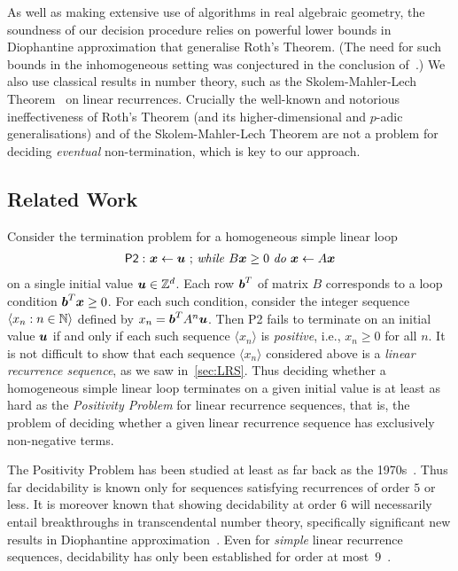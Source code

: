 As well as making extensive use of algorithms in real algebraic
geometry, the soundness of our decision procedure relies on powerful
lower bounds in Diophantine approximation that generalise Roth's
Theorem.  (The need for such bounds in the inhomogeneous setting was
conjectured in the conclusion of~\cite{Bra06}.)  We
also use classical results in number theory, such as the
Skolem-Mahler-Lech Theorem~\cite{Lec53,Mah35,Sko34} on linear
recurrences.  Crucially the well-known and notorious ineffectiveness
of Roth's Theorem (and its higher-dimensional and $p$-adic
generalisations) and of the Skolem-Mahler-Lech Theorem are not a
problem for deciding \emph{eventual} non-termination, which is key to
our approach.

\subsection{Related Work}

Consider the termination problem for a homogeneous simple linear loop
\begin{gather*}
\mathsf{P2:}\  \mbox{$\boldsymbol{x}\gets \boldsymbol{u}$ ;
\textit{while} $B\boldsymbol{x} \geq 0$ \textit{do} $\boldsymbol{x}\leftarrow A\boldsymbol{x}$}
\end{gather*}
on a single initial value $\boldsymbol{u}\in \mathbb{Z}^{d}$.  Each row
$\boldsymbol{b}^T$ of matrix $B$ corresponds to a loop condition
$\boldsymbol{b}^T\boldsymbol{x} \geq 0$.  For each such condition,
consider the integer sequence $\langle x_n : n \in \mathbb{N} \rangle$
defined by $x_n = \boldsymbol{b}^TA^n \boldsymbol{u}$.  Then
\textsf{P2} fails to terminate on an initial value $\boldsymbol{u}$ if
and only if each such sequence $\langle x_n \rangle$ is
\emph{positive}, i.e., $x_n \geq 0$ for all $n$.  It is not difficult
to show that each sequence $\langle x_n \rangle$ considered above is a
\emph{linear recurrence sequence}, as we saw in~\cref{sec:LRS}.
Thus deciding whether a homogeneous simple linear loop
terminates on a given initial value is at least as hard as the
\emph{Positivity Problem} for linear recurrence sequences, that is,
the problem of deciding whether a given linear recurrence sequence has
exclusively non-negative terms.

The Positivity Problem has been studied at least as far back as the
1970s~\cite{BG07,HHH06,Liu10,RS94,Sal76}.  Thus far decidability is
known only for sequences satisfying recurrences of order $5$ or less.
It is moreover known that showing decidability at order $6$ will
necessarily entail breakthroughs in transcendental number theory,
specifically significant new results in Diophantine
approximation~\cite{OW14:SODA}. Even for \emph{simple} linear recurrence
sequences, decidability has only been established for order at
most~$9$~\cite{OW13:constructive-positivity}.

